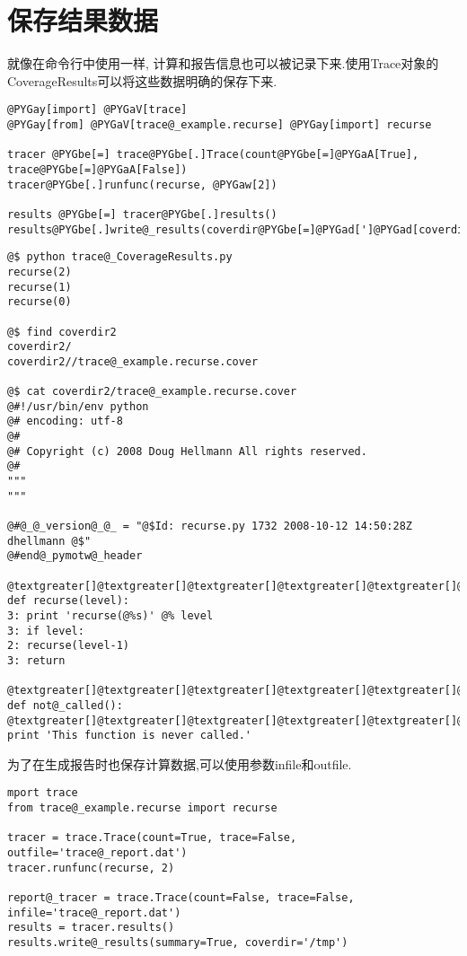 \documentclass[a4paper,10pt,english]{manual}
\begin{document}
\section{保存结果数据}

就像在命令行中使用一样, 计算和报告信息也可以被记录下来.使用Trace对象的CoverageResults可以将这些数据明确的保存下来.

\begin{Verbatim}[commandchars=@\[\]]
@PYGay[import] @PYGaV[trace]
@PYGay[from] @PYGaV[trace@_example.recurse] @PYGay[import] recurse

tracer @PYGbe[=] trace@PYGbe[.]Trace(count@PYGbe[=]@PYGaA[True], trace@PYGbe[=]@PYGaA[False])
tracer@PYGbe[.]runfunc(recurse, @PYGaw[2])

results @PYGbe[=] tracer@PYGbe[.]results()
results@PYGbe[.]write@_results(coverdir@PYGbe[=]@PYGad[']@PYGad[coverdir2]@PYGad['])
\end{Verbatim}

\begin{Verbatim}[commandchars=@\[\]]
@$ python trace@_CoverageResults.py
recurse(2)
recurse(1)
recurse(0)

@$ find coverdir2
coverdir2/
coverdir2//trace@_example.recurse.cover

@$ cat coverdir2/trace@_example.recurse.cover
@#!/usr/bin/env python
@# encoding: utf-8
@#
@# Copyright (c) 2008 Doug Hellmann All rights reserved.
@#
"""
"""

@#@_@_version@_@_ = "@$Id: recurse.py 1732 2008-10-12 14:50:28Z dhellmann @$"
@#end@_pymotw@_header

@textgreater[]@textgreater[]@textgreater[]@textgreater[]@textgreater[]@textgreater[] def recurse(level):
3: print 'recurse(@%s)' @% level
3: if level:
2: recurse(level-1)
3: return

@textgreater[]@textgreater[]@textgreater[]@textgreater[]@textgreater[]@textgreater[] def not@_called():
@textgreater[]@textgreater[]@textgreater[]@textgreater[]@textgreater[]@textgreater[] print 'This function is never called.'
\end{Verbatim}

为了在生成报告时也保存计算数据,可以使用参数infile和outfile.

\begin{Verbatim}[commandchars=@\[\]]
mport trace
from trace@_example.recurse import recurse

tracer = trace.Trace(count=True, trace=False, outfile='trace@_report.dat')
tracer.runfunc(recurse, 2)

report@_tracer = trace.Trace(count=False, trace=False, infile='trace@_report.dat')
results = tracer.results()
results.write@_results(summary=True, coverdir='/tmp')
\end{Verbatim}
\end{document}

